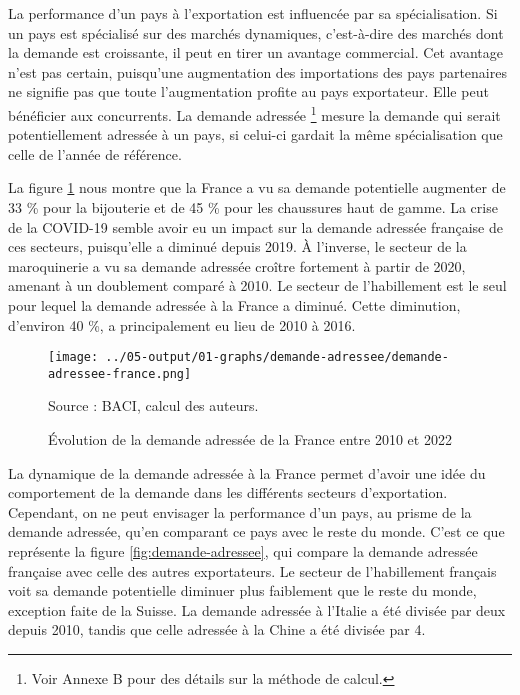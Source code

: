\documentclass[french,10pt,a4paper]{article}
\begin{document}

La performance d'un pays à l'exportation est influencée par sa spécialisation. Si un pays est spécialisé sur des marchés dynamiques, c'est-à-dire des marchés dont la demande est croissante, il peut en tirer un avantage commercial. Cet avantage n'est pas certain, puisqu'une augmentation des importations des pays partenaires ne signifie pas que toute l'augmentation profite au pays exportateur. Elle peut bénéficier aux concurrents. La demande adressée \footnote{Voir Annexe B pour des détails sur la méthode de calcul.} mesure la demande qui serait potentiellement adressée à un pays, si celui-ci gardait la même spécialisation que celle de l'année de référence.

La figure \ref{fig:demande-adressee-france} nous montre que la France a vu sa demande potentielle augmenter de 33 \% pour la bijouterie et de 45 \% pour les chaussures haut de gamme. La crise de la COVID-19 semble avoir eu un impact sur la demande adressée française de ces secteurs, puisqu'elle a diminué depuis 2019. À l'inverse, le secteur de la maroquinerie a vu sa demande adressée croître fortement à partir de 2020, amenant à un doublement comparé à 2010. Le secteur de l'habillement est le seul pour lequel la demande adressée à la France a diminué. Cette diminution, d'environ 40 \%, a principalement eu lieu de 2010 à 2016.

\begin{figure}[!h]
  \centering  \texttt{[image: ../05-output/01-graphs/demande-adressee/demande-adressee-france.png]}
  \captionsetup{justification=raggedright,singlelinecheck=false, font=small}
  \caption*{Source : BACI, calcul des auteurs.}
  \captionsetup{justification=centering, singlelinecheck=true, font=normalsize}
  \caption{Évolution de la demande adressée de la France entre 2010 et 2022}
  \label{fig:demande-adressee-france}
\end{figure}

La dynamique de la demande adressée à la France permet d'avoir une idée du comportement de la demande dans les différents secteurs d'exportation. Cependant, on ne peut envisager la performance d'un pays, au prisme de la demande adressée, qu'en comparant ce pays avec le reste du monde. C'est ce que représente la figure \ref{fig:demande-adressee}, qui compare la demande adressée française avec celle des autres exportateurs. Le secteur de l'habillement français voit sa demande potentielle diminuer plus faiblement que le reste du monde, exception faite de la Suisse. La demande adressée à l'Italie a été divisée par deux depuis 2010, tandis que celle adressée à la Chine a été divisée par 4.
\end{document}
